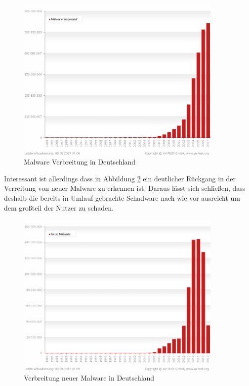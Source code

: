 \begin{figure}[H]
  \centering
  \includegraphics[width=10cm]{images/malware-all-years_sum_de}
  \caption[Malware Verbreitung in Deutschland]{Malware Verbreitung in Deutschland\protect\footnotemark}
  \label{fig:malware}
\end{figure}

Interessant ist allerdings dass in Abbildung \ref{fig:malware-new} ein deutlicher Rückgang in der Verreitung von neuer Malware zu erkennen ist. Daraus lässt sich schließen, dass deshalb die bereits in Umlauf gebrachte Schadware nach wie vor ausreicht um dem großteil der Nutzer zu schaden.

\begin{figure}[H]
  \centering
  \includegraphics[width=10cm]{images/malware-all-years_de}
  \caption[Verbreitung neuer Malware in Deutschland]{Verbreitung neuer Malware in Deutschland\protect\footnotemark}
  \label{fig:malware-new}
\end{figure}

